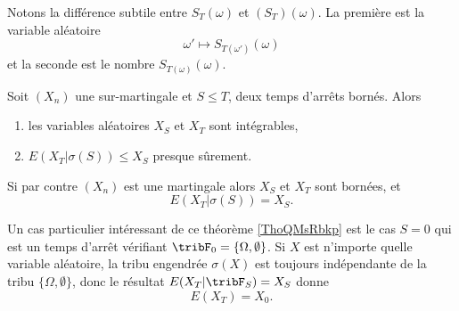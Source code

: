 \begin{remark}
    Notons la différence subtile entre \( S_T(\omega)\) et \( (S_T)(\omega)\). La première est la variable aléatoire
    \begin{equation}
        \omega'\mapsto S_{T(\omega')}(\omega)
    \end{equation}
    et la seconde est le nombre \( S_{T(\omega)}(\omega)\).
\end{remark}

\begin{theorem}   \label{ThoQMsRbkp}
    Soit \( (X_n)\) une sur-martingale et \( S\leq T\), deux temps d'arrêts bornés. Alors
    \begin{enumerate}
        \item
            les variables aléatoires \( X_{S}\) et \( X_{T}\) sont intégrables,
        \item
            \( E(X_{T}|  \sigma(S) )\leq X_{S}\) presque sûrement.
    \end{enumerate}
    Si par contre \( (X_n)\) est une martingale alors \( X_{S}\) et \( X_{T}\) sont bornées, et 
    \begin{equation}
        E(X_{T}|\sigma(S))=X_{S}.
    \end{equation}
\end{theorem}
\begin{remark}  \label{RemKCdpnid}
Un cas particulier intéressant de ce théorème \ref{ThoQMsRbkp} est le cas \( S=0\) qui est un temps d'arrêt vérifiant \( \tribF_0=\{ \Omega,\emptyset \}\). Si \( X\) est n'importe quelle variable aléatoire, la tribu engendrée \( \sigma(X)\) est toujours indépendante de la tribu \( \{ \Omega,\emptyset \}\), donc le résultat $E(X_T|\tribF_S)=X_S$ donne
\begin{equation}
    E(X_T)=X_0.
\end{equation}
\end{remark}

